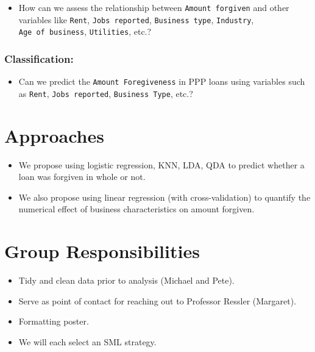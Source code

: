 \documentclass[
  letterpaper,
  DIV=11,
  numbers=noendperiod]{scrartcl}
\providecommand{\tightlist}{%
  \setlength{\itemsep}{0pt}\setlength{\parskip}{0pt}}\usepackage{longtable,booktabs,array}
\begin{document}
\begin{itemize}
\tightlist
\item
  How can we assess the relationship between \texttt{Amount\ forgiven}
  and other variables like \texttt{Rent}, \texttt{Jobs\ reported},
  \texttt{Business\ type}, \texttt{Industry},
  \texttt{Age\ of\ business}, \texttt{Utilities}, etc.?
\end{itemize}

\hypertarget{classification}{%
\subsubsection{Classification:}\label{classification}}

\begin{itemize}
\tightlist
\item
  Can we predict the \texttt{Amount\ Foregiveness} in PPP loans using
  variables such as \texttt{Rent}, \texttt{Jobs\ reported},
  \texttt{Business\ Type}, etc.?
\end{itemize}

\hypertarget{approaches}{%
\section{Approaches}\label{approaches}}

\begin{itemize}
\tightlist
\item
  We propose using logistic regression, KNN, LDA, QDA to predict whether
  a loan was forgiven in whole or not.
\item
  We also propose using linear regression (with cross-validation) to
  quantify the numerical effect of business characteristics on amount
  forgiven.
\end{itemize}

\hypertarget{group-responsibilities}{%
\section{Group Responsibilities}\label{group-responsibilities}}

\begin{itemize}
\item
  Tidy and clean data prior to analysis (Michael and Pete).
\item
  Serve as point of contact for reaching out to Professor Ressler
  (Margaret).
\item
  Formatting poster.
\item
  We will each select an SML strategy.
\end{itemize}
\end{document}
